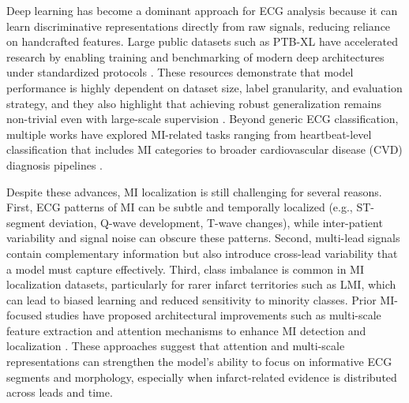 \documentclass[preprint,12pt]{elsarticle}
\begin{document}
Deep learning has become a dominant approach for ECG analysis because it can learn discriminative representations directly from raw signals, reducing reliance on handcrafted features. Large public datasets such as PTB-XL have accelerated research by enabling training and benchmarking of modern deep architectures under standardized protocols \cite{Wagner2020SciData_PTBXL,StrodthoffWagnerSchaeffterSamek2021JBHI_PTBXL_Benchmarks,SmigielPalczynskiLedzinski2021Entropy_DL_PTBXL,PalczynskiSmigielLedzinskiBujnowski2022Sensors_FewShot_PTBXL}. These resources demonstrate that model performance is highly dependent on dataset size, label granularity, and evaluation strategy, and they also highlight that achieving robust generalization remains non-trivial even with large-scale supervision \cite{StrodthoffWagnerSchaeffterSamek2021JBHI_PTBXL_Benchmarks,Wagner2020SciData_PTBXL}. Beyond generic ECG classification, multiple works have explored MI-related tasks ranging from heartbeat-level classification that includes MI categories to broader cardiovascular disease (CVD) diagnosis pipelines \cite{Pham2023Sensors_Heartbeat_ArrMI,Gong2025PLOSone_CNN_CBAM_GRU_CVD}.

Despite these advances, MI localization is still challenging for several reasons. First, ECG patterns of MI can be subtle and temporally localized (e.g., ST-segment deviation, Q-wave development, T-wave changes), while inter-patient variability and signal noise can obscure these patterns. Second, multi-lead signals contain complementary information but also introduce cross-lead variability that a model must capture effectively. Third, class imbalance is common in MI localization datasets, particularly for rarer infarct territories such as LMI, which can lead to biased learning and reduced sensitivity to minority classes. Prior MI-focused studies have proposed architectural improvements such as multi-scale feature extraction and attention mechanisms to enhance MI detection and localization \cite{Cao2022FrontPhysiol_MSResNet_Attn_MI,Chen2025Biosensors_MDF_Fusion_MI,Cheng2024AIMLR_Attn_MultiScale_SilentMI_AF}. These approaches suggest that attention and multi-scale representations can strengthen the model's ability to focus on informative ECG segments and morphology, especially when infarct-related evidence is distributed across leads and time.
\end{document}
